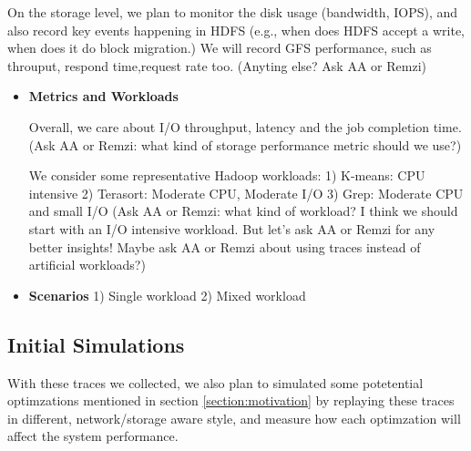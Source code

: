 On the storage level, we plan to monitor the disk usage (bandwidth, IOPS), and also record key events happening in HDFS (e.g., when does HDFS accept a write, when does it do block migration.) We will record GFS performance, such as throuput, respond time,request rate too. (Anyting else? Ask AA or Remzi)


\begin{itemize}
	\item {\bf Metrics and Workloads}

Overall, we care about I/O throughput, latency and the job completion time. (Ask AA or Remzi: what kind of storage performance metric should we use?)

We consider some representative Hadoop workloads:
1) K-means: CPU intensive
2) Terasort: Moderate CPU, Moderate I/O
3) Grep: Moderate CPU and small I/O
(Ask AA or Remzi: what kind of workload? I think we should start with an I/O intensive workload. But let's ask AA or Remzi for any better insights! Maybe ask AA or Remzi about using traces instead of artificial workloads?)
	
	\item {\bf Scenarios}
1) Single workload
2) Mixed workload

\end{itemize}

\subsection{\bf Initial Simulations}
With these traces we collected, we also plan to simulated some potetential optimzations mentioned in section \ref{section:motivation} by replaying these traces in different, network/storage aware style, and measure how each optimzation will affect the system performance.



